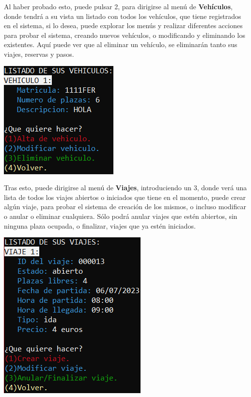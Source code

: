 Al haber probado esto, puede pulsar 2, para dirigirse al menú de \textbf{Vehículos}, donde tendrá a su vista un listado con todos los vehículos, que tiene registrados en el sistema, si lo desea,
puede explorar los menús y realizar diferentes acciones para probar el sistema, creando nuevos vehículos, o modificando y eliminando los existentes. Aquí puede ver que al eliminar un vehículo,
se eliminarán tanto sus viajes, reservas y pasos.
\begin{center}
  \includegraphics[]{FOTOS/menuConductorVehiculo.png}
\end{center}
Tras esto, puede dirigirse al menú de \textbf{Viajes}, introduciendo un 3, donde verá una lista de todos los viajes abiertos o iniciados que tiene en el momento, puede crear algún viaje,
para probar el sistema de creación de los mismos, o incluso modificar o anular o eliminar cualquiera. Sólo podrá anular viajes que estén abiertos, sin ninguna plaza ocupada, o finalizar,
viajes que ya estén iniciados.
\begin{center}
  \includegraphics[]{FOTOS/menuConductorViaje.png}
\end{center}

\newpage

